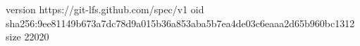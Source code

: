 version https://git-lfs.github.com/spec/v1
oid sha256:9ee81149b673a7dc78d9a015b36a853aba5b7ea4de03c6eaaa2d65b960bc1312
size 22020
